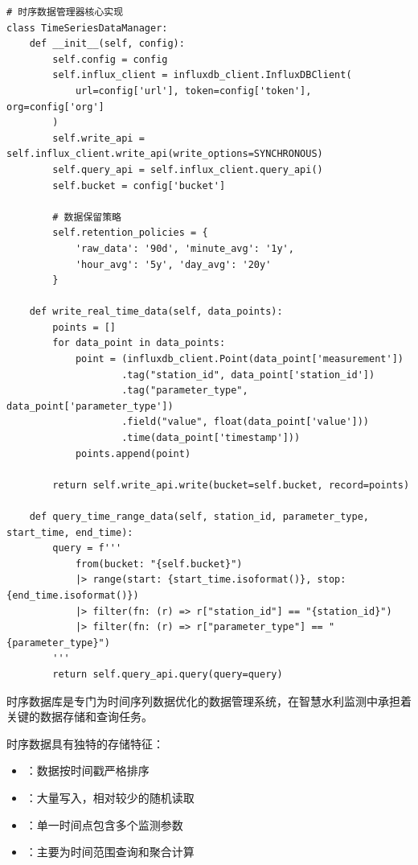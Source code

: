 \begin{lstlisting}[style=python]
# 时序数据管理器核心实现
class TimeSeriesDataManager:
    def __init__(self, config):
        self.config = config
        self.influx_client = influxdb_client.InfluxDBClient(
            url=config['url'], token=config['token'], org=config['org']
        )
        self.write_api = self.influx_client.write_api(write_options=SYNCHRONOUS)
        self.query_api = self.influx_client.query_api()
        self.bucket = config['bucket']
        
        # 数据保留策略
        self.retention_policies = {
            'raw_data': '90d', 'minute_avg': '1y', 
            'hour_avg': '5y', 'day_avg': '20y'
        }
    
    def write_real_time_data(self, data_points):
        points = []
        for data_point in data_points:
            point = (influxdb_client.Point(data_point['measurement'])
                    .tag("station_id", data_point['station_id'])
                    .tag("parameter_type", data_point['parameter_type'])
                    .field("value", float(data_point['value']))
                    .time(data_point['timestamp']))
            points.append(point)
        
        return self.write_api.write(bucket=self.bucket, record=points)
    
    def query_time_range_data(self, station_id, parameter_type, start_time, end_time):
        query = f'''
            from(bucket: "{self.bucket}")
            |> range(start: {start_time.isoformat()}, stop: {end_time.isoformat()})
            |> filter(fn: (r) => r["station_id"] == "{station_id}")
            |> filter(fn: (r) => r["parameter_type"] == "{parameter_type}")
        '''
        return self.query_api.query(query=query)
\end{lstlisting}


时序数据库是专门为时间序列数据优化的数据管理系统，在智慧水利监测中承担着关键的数据存储和查询任务。


时序数据具有独特的存储特征：

\begin{itemize}
\tightlist
\item
  ：数据按时间戳严格排序
\item
  ：大量写入，相对较少的随机读取
\item
  ：单一时间点包含多个监测参数
\item
  ：主要为时间范围查询和聚合计算
\end{itemize}

